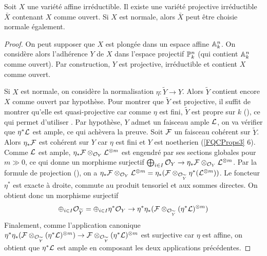 \begin{lem}\label{CompletionNormal}
Soit $X$ une variété affine irréductible.
Il existe une variété projective irréductible $\bar{X}$ contenant $X$ comme ouvert. Si $X$ est normale, alors $\bar{X}$ peut être choisie normale également.
\end{lem}
\begin{proof}
On peut supposer que $X$ est plongée dans un espace affine $\mathbb{A}^n_k$. On considère alors l'adhérence $Y$ de $X$ dans l'espace projectif $\mathbb{P}^n_k$ (qui contient $\mathbb{A}^n_k$ comme ouvert). Par construction, $Y$ est projective, irréductible et contient $X$ comme ouvert.

Si $X$ est normale, on considère la normalisation $\eta:\widetilde{Y}\rightarrow Y$. Alors $\widetilde{Y}$ contient encore $X$ comme ouvert par hypothèse. Pour montrer que $\widetilde{Y}$ est projective, il suffit de montrer qu'elle est quasi-projective car comme $\eta$ est fini, $\widetilde{Y}$ est propre sur $k$ (\cite[II.4.8, ex II.4.1]{Hartshorne}), ce qui permet d'utiliser \cite[ex II.4.4]{Hartshorne}. Par hypothèse, $Y$ admet un faisceau ample $\mathcal{L}$, on va vérifier que $\eta^*\mathcal{L}$ est ample, ce qui achèvera la preuve. Soit $\mathcal{F}$ un faisceau cohérent sur $\widetilde{Y}$. Alors $\eta_*\mathcal{F}$ est cohérent sur $Y$ car $\eta$ est fini et $Y$ est noetherien (\ref{FQCProps3} 6). Comme $\mathcal{L}$ est ample, $\eta_*\mathcal{F}\otimes_{\mathcal{O}_Y} \mathcal{L}^{\otimes m}$ est engendré par ses sections globales pour $m\gg 0$, ce qui donne un morphisme surjectif $\bigoplus_{i\in I}\mathcal{O}_Y\rightarrow \eta_*\mathcal{F}\otimes_{\mathcal{O}_Y} \mathcal{L}^{\otimes m}$. Par la formule de projection (\cite[ex II.5.1.d]{Hartshorne}), on a $\eta_*\mathcal{F}\otimes_{\mathcal{O}_Y} \mathcal{L}^{\otimes m}=\eta_*(\mathcal{F}\otimes_{\mathcal{O}_{\widetilde{Y}}}\eta^*(\mathcal{L}^{\otimes m}))$. Le foncteur $\eta^*$ est exacte à droite, commute au produit tensoriel et aux sommes directes. On obtient donc un morphisme surjectif 
$$\oplus_{i\in I}\mathcal{O}_{\widetilde{Y}}=\oplus_{i\in I}\eta^*\mathcal{O}_Y\rightarrow \eta^*\eta_*(\mathcal{F}\otimes_{\mathcal{O}_{\widetilde{Y}}}(\eta^*\mathcal{L})^{\otimes m})$$
Finalement, comme l'application canonique $\eta^*\eta_*(\mathcal{F}\otimes_{\mathcal{O}_{\widetilde{Y}}}(\eta^*\mathcal{L})^{\otimes m})\rightarrow \mathcal{F}\otimes_{\mathcal{O}_{\widetilde{Y}}}(\eta^*\mathcal{L})^{\otimes m}$ est surjective car $\eta$ est affine, on obtient que $\eta^*\mathcal{L}$ est ample en composant les deux applications précédentes.
\end{proof}

